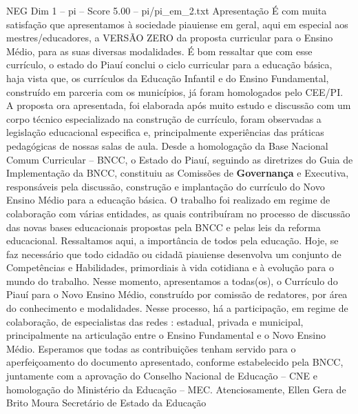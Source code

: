 \begin{textsample}{NEG Dim 1 – pi – Score 5.00 – pi/pi\_em\_2.txt}  \label{ex:f1_neg_237}
Apresentação É com muita satisfação que apresentamos à sociedade piauiense em geral, aqui em especial aos mestres/educadores, a VERSÃO ZERO da proposta curricular para o Ensino Médio, para as suas diversas modalidades.
É bom ressaltar que com esse currículo, o estado do Piauí conclui o ciclo curricular para a educação básica, haja vista que, os currículos da Educação Infantil e do Ensino Fundamental, construído em parceria com os municípios, já foram homologados pelo CEE/PI.
A proposta ora apresentada, foi elaborada após muito estudo e discussão com um corpo técnico especializado na construção de currículo, foram observadas a legislação educacional especifica e, principalmente experiências das práticas pedagógicas de nossas salas de aula.
Desde a homologação da Base Nacional Comum Curricular – BNCC, o Estado do Piauí, seguindo as diretrizes do Guia de Implementação da BNCC, constituiu as Comissões de \textbf{Governança} e Executiva, responsáveis pela discussão, construção e implantação do currículo do Novo Ensino Médio para a educação básica.
O trabalho foi realizado em regime de colaboração com várias entidades, as quais contribuíram no processo de discussão das novas bases educacionais propostas pela BNCC e pelas leis da reforma educacional.
Ressaltamos aqui, a importância de todos pela educação.
Hoje, se faz necessário que todo cidadão ou cidadã piauiense desenvolva um conjunto de Competências e Habilidades, primordiais à vida cotidiana e à evolução para o mundo do trabalho.
Nesse momento, apresentamos a todas(os), o Currículo do Piauí para o Novo Ensino Médio, construído por comissão de redatores, por área do conhecimento e modalidades.
Nesse processo, há a participação, em regime de colaboração, de especialistas das redes : estadual, privada e municipal, principalmente na articulação entre o Ensino Fundamental e o Novo Ensino Médio.
Esperamos que todas as contribuições tenham servido para o aperfeiçoamento do documento apresentado, conforme estabelecido pela BNCC, juntamente com a aprovação do Conselho Nacional de Educação – CNE e homologação do Ministério da Educação – MEC.
Atenciosamente, Ellen Gera de Brito Moura Secretário de Estado da Educação

\end{textsample}
